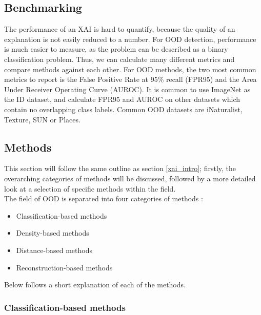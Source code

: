 \documentclass[conference,onecolumn]{IEEEtran}
\begin{document}

\subsection{Benchmarking}

The performance of an XAI is hard to quantify, because the quality of an explanation is not easily reduced to a number. For OOD detection, performance is much easier to measure, as the problem can be described as a binary classification problem. Thus, we can calculate many different metrics and compare methods against each other. For OOD methods, the two most common metrics to report is the False Positive Rate at 95\% recall (FPR95) and the Area Under Receiver Operating Curve (AUROC). It is common to use ImageNet as the ID dataset, and calculate FPR95 and AUROC on other datasets which contain no overlapping class labels. Common OOD datasets are iNaturalist, Texture, SUN or Places.

\subsection{Methods}

This section will follow the same outline as section \ref{xai_intro}; firstly, the overarching categories of methods will be discussed, followed by a more detailed look at a selection of specific methods within the field.
\\

The field of OOD is separated into four categories of methods \cite{oodoverview}:

\begin{itemize}
  \item Classification-based methods
  \item Density-based methods
  \item Distance-based methods
  \item Reconstruction-based methods
\end{itemize}

Below follows a short explanation of each of the methods.
\\

\subsubsection{Classification-based methods}
\end{document}
